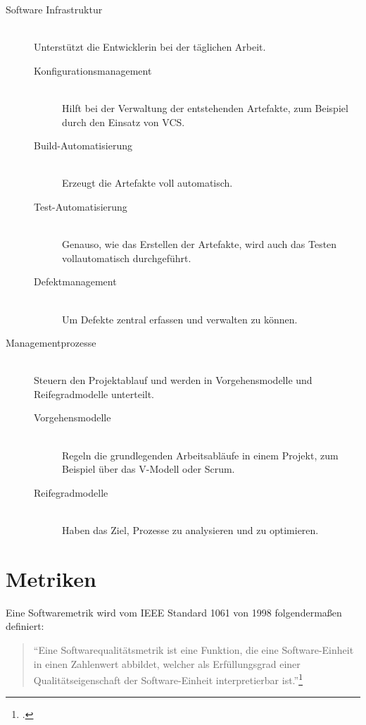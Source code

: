 \begin{description}
  \item[Software Infrastruktur] \hfill \\ Unterstützt die Entwicklerin bei der täglichen Arbeit.
  \begin{description}
    \item[Konfigurationsmanagement] \hfill \\ Hilft bei der Verwaltung der entstehenden Artefakte, zum Beispiel durch den Einsatz von \ac{VCS}.
    \item[Build-Automatisierung] \hfill \\ Erzeugt die Artefakte voll automatisch.
    \item[Test-Automatisierung] \hfill \\ Genauso, wie das Erstellen der Artefakte, wird auch das Testen vollautomatisch durchgeführt.
    \item[Defektmanagement] \hfill \\ Um Defekte zentral erfassen und verwalten zu können.
  \end{description}
  \item[Managementprozesse] \hfill \\ Steuern den Projektablauf und werden in Vorgehensmodelle und Reifegradmodelle unterteilt.
  \begin{description}
    \item[Vorgehensmodelle] \hfill \\ Regeln die grundlegenden Arbeitsabläufe in einem Projekt, zum Beispiel über das V-Modell oder Scrum.
    \item[Reifegradmodelle] \hfill \\ Haben das Ziel, Prozesse zu analysieren und zu optimieren.
  \end{description}
\end{description}

\clearpage
\section{Metriken}

Eine Softwaremetrik wird vom \ac{IEEE} Standard 1061 von 1998 folgendermaßen definiert:
\begin{quote}
  ``Eine Softwarequalitätsmetrik ist eine Funktion, die eine Software-Einheit in einen Zahlenwert abbildet, welcher als Erfüllungsgrad einer Qualitätseigenschaft der Software-Einheit interpretierbar ist.''\footcite[vgl.][S.3]{ieee-1061}
\end{quote}

